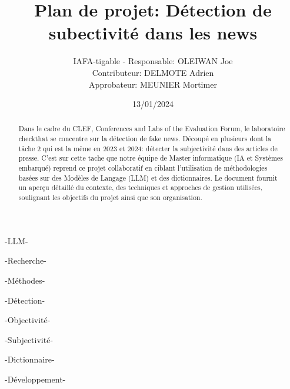 \documentclass[11pt]{rapport_class}
\title{Plan de projet: Détection de subectivité dans les news}
\author{IAFA-tigable - Responsable: OLEIWAN Joe \\ Contributeur: DELMOTE Adrien \\ Approbateur: MEUNIER Mortimer}
\date{13/01/2024}
\begin{document}
\maketitle

\begin{abstract}
Dans le cadre du CLEF, Conferences and Labs of the Evaluation Forum, le laboratoire checkthat se concentre sur la détection de fake news. Découpé en plusieurs dont la tâche 2 qui est la même en 2023 et 2024: détecter la subjectivité dans des articles de presse. C'est sur cette tache que notre équipe de Master informatique (IA et Systèmes embarqué) reprend ce projet collaboratif en ciblant l'utilisation de méthodologies basées sur des Modèles de Langage (LLM) et des dictionnaires. Le document fournit un aperçu détaillé du contexte, des techniques et approches de gestion utilisées, soulignant les objectifs du projet ainsi que son organisation.
\end{abstract}

\smallskip
\begin{motsclefs}
\smallskip
\centerline{-LLM-}
\centerline{-Recherche-}
\centerline{-Méthodes-}
\centerline{-Détection-}
\centerline{-Objectivité-}
\centerline{-Subjectivité-}
\centerline{-Dictionnaire-}
\centerline{-Développement-}
\end{motsclefs}

\tableofcontents
\end{document}
